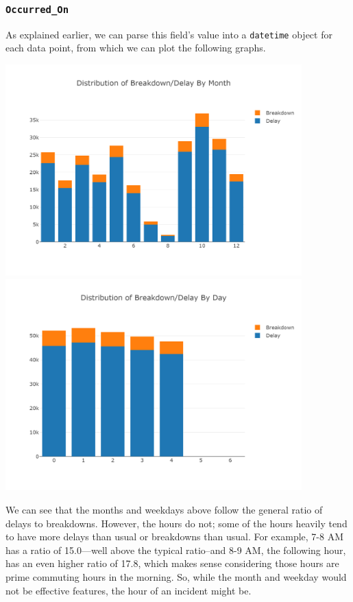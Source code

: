 \documentclass[11pt]{article}
\begin{document}
\subsubsection{\texttt{Occurred\_On}}
As explained earlier, we can parse this field's value into a \texttt{datetime} object for each data point, from which we can plot the following graphs.
\begin{center}
\includegraphics[width=4.5in]{images/month_stacked.png}
\includegraphics[width=4.5in]{images/weekday_stacked.png}
\end{center}
We can see that the months and weekdays above follow the general ratio of delays to breakdowns. However, the hours do not; some of the hours heavily tend to have more delays than usual or breakdowns than usual. For example, 7-8 AM has a ratio of 15.0---well above the typical ratio--and 8-9 AM, the following hour, has an even higher ratio of 17.8, which makes sense considering those hours are prime commuting hours in the morning. So, while the month and weekday would not be effective features, the hour of an incident might be.
\end{document}
